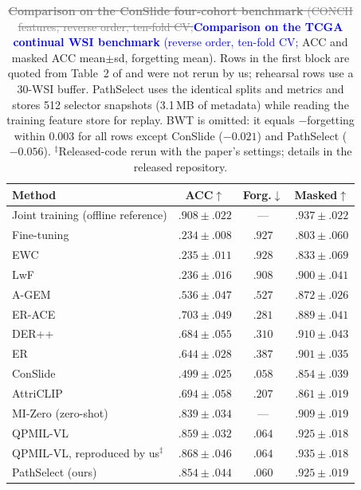 \documentclass{article}
\newif\ifmarkup \markuptrue
\newcommand{\del}[1]{\ifmarkup\textcolor{gray}{\sout{#1}}\fi}
\newcommand{\ins}[1]{\ifmarkup\textcolor{blue}{#1}\else#1\fi}
\newcommand{\rep}[2]{\del{#1}\ins{#2}}
\begin{document}
\begin{table}[!t]
\centering\footnotesize\renewcommand{\arraystretch}{0.93}
\setlength{\tabcolsep}{3.5pt}
\caption{\protect\rep{\textbf{Comparison on the ConSlide four-cohort benchmark} \cite{huang2023conslide} (CONCH features, reverse order, ten-fold CV;}{\textbf{Comparison on the TCGA continual WSI benchmark} (reverse order, ten-fold CV;} ACC and masked ACC mean$\pm$sd, forgetting mean). Rows in the first block are quoted from Table~2 of \cite{gou2025qpmil} and were not rerun by us; rehearsal rows use a 30-WSI buffer. PathSelect uses the identical splits and metrics and stores 512 selector snapshots (3.1\,MB of metadata) while reading the training feature store for replay. BWT is omitted: it equals $-$forgetting within $0.003$ for all rows except ConSlide ($-0.021$) and PathSelect ($-0.056$). $^\ddagger$Released-code rerun with the paper's settings; details in the released repository.}
\label{tab:sota}
\begin{tabular}{lccc}
\toprule
Method & ACC$\uparrow$ & Forg.$\downarrow$ & Masked$\uparrow$ \\
\midrule
Joint training (offline reference) & $.908{\pm}.022$ & --- & $.937{\pm}.022$ \\
Fine-tuning & $.234{\pm}.008$ & $.927$ & $.803{\pm}.060$ \\
EWC \cite{kirkpatrick2017ewc} & $.235{\pm}.011$ & $.928$ & $.833{\pm}.069$ \\
LwF \cite{li2017lwf} & $.236{\pm}.016$ & $.908$ & $.900{\pm}.041$ \\
A-GEM \cite{chaudhry2019agem} & $.536{\pm}.047$ & $.527$ & $.872{\pm}.026$ \\
ER-ACE \cite{caccia2022erace} & $.703{\pm}.049$ & $.281$ & $.889{\pm}.041$ \\
DER++ \cite{buzzega2020derpp} & $.684{\pm}.055$ & $.310$ & $.910{\pm}.043$ \\
ER \cite{chaudhry2019er} & $.644{\pm}.028$ & $.387$ & $.901{\pm}.035$ \\
ConSlide \cite{huang2023conslide} & $.499{\pm}.025$ & $.058$ & $.854{\pm}.039$ \\
AttriCLIP \cite{wang2023attriclip} & $.694{\pm}.058$ & $.207$ & $.861{\pm}.019$ \\
MI-Zero \cite{lu2023mizero} (zero-shot) & $.839{\pm}.034$ & --- & $.909{\pm}.019$ \\
QPMIL-VL \cite{gou2025qpmil} & $.859{\pm}.032$ & $.064$ & $.925{\pm}.018$ \\
\midrule
QPMIL-VL, reproduced by us$^\ddagger$ & $.868{\pm}.046$ & $.064$ & $.935{\pm}.018$ \\
\midrule
PathSelect (ours) & $.854{\pm}.044$ & $.060$ & $.925{\pm}.019$ \\
\bottomrule
\end{tabular}
\end{table}
\end{document}
